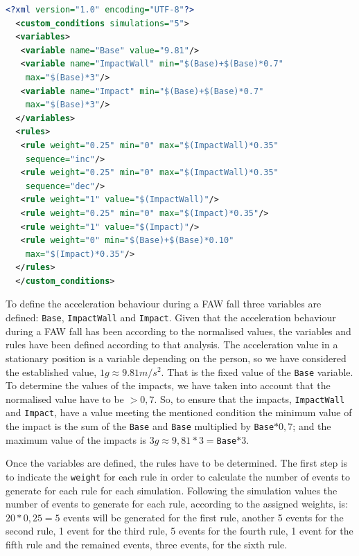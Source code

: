 \documentclass[review]{elsarticle}
\begin{document}
\begin{lstlisting}[basicstyle=\ttfamily\footnotesize,language=XML,caption={Rules to define a FAW fall},label=FAWFallRules]
  <?xml version="1.0" encoding="UTF-8"?>
  <custom_conditions simulations="5">
  <variables>
   <variable name="Base" value="9.81"/>
   <variable name="ImpactWall" min="$(Base)+$(Base)*0.7" 
    max="$(Base)*3"/>
   <variable name="Impact" min="$(Base)+$(Base)*0.7" 
    max="$(Base)*3"/>
  </variables>
  <rules>
   <rule weight="0.25" min="0" max="$(ImpactWall)*0.35" 
    sequence="inc"/>
   <rule weight="0.25" min="0" max="$(ImpactWall)*0.35" 
    sequence="dec"/>
   <rule weight="1" value="$(ImpactWall)"/>
   <rule weight="0.25" min="0" max="$(Impact)*0.35"/>
   <rule weight="1" value="$(Impact)"/>
   <rule weight="0" min="$(Base)+$(Base)*0.10"
    max="$(Impact)*0.35"/>
  </rules>
  </custom_conditions>
\end{lstlisting}

To define the acceleration behaviour during a FAW fall three variables are defined: \texttt{Base}, 
\texttt{ImpactWall} and \texttt{Impact}. Given that the acceleration behaviour during a FAW fall has
been according to the normalised values, the variables and rules have been defined according to 
that analysis. The acceleration value in a stationary position is a variable depending on the person, so 
we have considered the established value, $1g\approx9.81m/s^{2}$. That is the fixed value of the 
\texttt{Base} variable. To determine the values of the impacts, we have taken into account that the 
normalised value have to be $> 0,7$. So, to ensure that the impacts, \texttt{ImpactWall} and 
\texttt{Impact}, have a value meeting the mentioned condition the minimum value of the impact is the 
sum of the \texttt{Base} and \texttt{Base} multiplied by \texttt{Base}$*0,7$; and the maximum value of the
impacts is $3g\approx9,81*3=$\texttt{Base}$*3$.

Once the variables are defined, the rules have to be determined. The first step is to indicate the 
\texttt{weight} for each rule in order to calculate the number of events to generate for each rule for 
each simulation. Following the simulation values the number of events to generate for each rule, according 
to the assigned weights, is: $20 * 0,25 = 5$ events will be generated for the first rule, another 5 events 
for the second rule, 1 event for the third rule, 5 events for the fourth rule, 1 event for the fifth
rule and the remained events, three events, for the sixth rule. 
\end{document}
